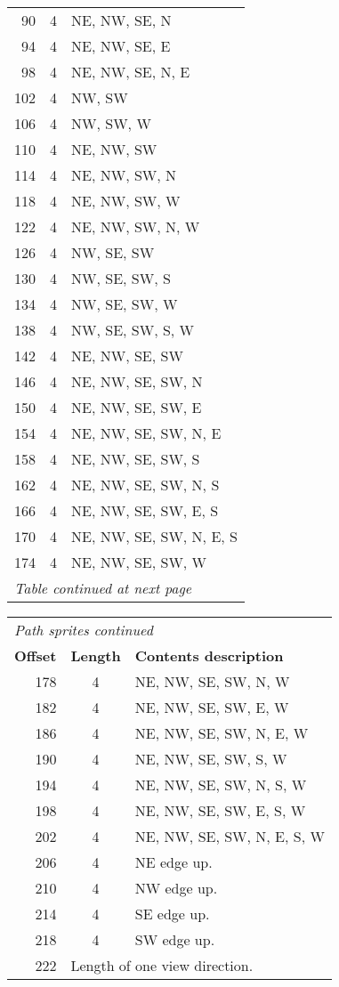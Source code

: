 \documentclass{article}
\begin{document}
\begin{center}
\begin{tabular}{|r|c|l|}
  90 &  4 & NE, NW, SE, N \\
  94 &  4 & NE, NW, SE, E \\
  98 &  4 & NE, NW, SE, N, E \\
 102 &  4 & NW, SW \\
 106 &  4 & NW, SW, W \\
 110 &  4 & NE, NW, SW \\
 114 &  4 & NE, NW, SW, N \\
 118 &  4 & NE, NW, SW, W \\
 122 &  4 & NE, NW, SW, N, W \\
 126 &  4 & NW, SE, SW \\
 130 &  4 & NW, SE, SW, S \\
 134 &  4 & NW, SE, SW, W \\
 138 &  4 & NW, SE, SW, S, W \\
 142 &  4 & NE, NW, SE, SW \\
 146 &  4 & NE, NW, SE, SW, N \\
 150 &  4 & NE, NW, SE, SW, E \\
 154 &  4 & NE, NW, SE, SW, N, E \\
 158 &  4 & NE, NW, SE, SW, S \\
 162 &  4 & NE, NW, SE, SW, N, S \\
 166 &  4 & NE, NW, SE, SW, E, S \\
 170 &  4 & NE, NW, SE, SW, N, E, S \\
 174 &  4 & NE, NW, SE, SW, W \\
\multicolumn{3}{|l|}{\textit{Table continued at next page}} \\ \hline
\end{tabular}
\end{center}

\begin{center}
\begin{tabular}{|r|c|l|} \hline
\multicolumn{3}{|l|}{\textit{Path sprites continued}} \\
\textbf{Offset} & \textbf{Length} & \textbf{Contents description} \\ \hline
 178 &  4 & NE, NW, SE, SW, N, W \\
 182 &  4 & NE, NW, SE, SW, E, W \\
 186 &  4 & NE, NW, SE, SW, N, E, W \\
 190 &  4 & NE, NW, SE, SW, S, W \\
 194 &  4 & NE, NW, SE, SW, N, S, W \\
 198 &  4 & NE, NW, SE, SW, E, S, W \\
 202 &  4 & NE, NW, SE, SW, N, E, S, W \\
 206 &  4 & NE edge up. \\
 210 &  4 & NW edge up. \\
 214 &  4 & SE edge up. \\
 218 &  4 & SW edge up. \\ \hline
 222 & \multicolumn{2}{l|}{Length of one view direction.} \\ \hline
\end{tabular}
\end{center}
\end{document}
